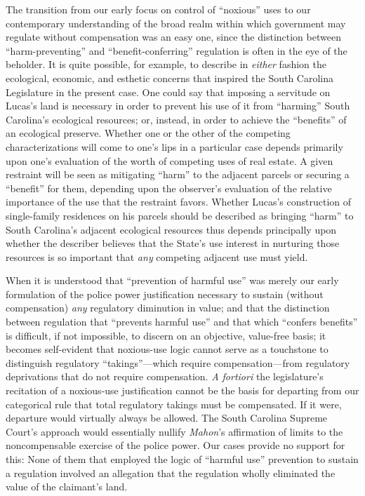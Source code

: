 The transition from our early focus on control of ``noxious'' uses to our
contemporary understanding of the broad realm within which government may
regulate without compensation was an easy one, since the distinction between
``harm-preventing'' and ``benefit-conferring'' regulation is often in the eye of
the beholder. It is quite possible, for example, to describe in \textit{either}
fashion the ecological, economic, and esthetic concerns that inspired the South
Carolina Legislature in the present case. One could say that imposing a
servitude on Lucas's land is necessary in order to prevent his use of it from
``harming'' South Carolina's ecological resources; or, instead, in order to
achieve the ``benefits'' of an ecological preserve. Whether one or the other of
the competing characterizations will come to one's lips in a particular case
depends primarily upon one's evaluation of the worth of competing uses of real
estate. A given restraint will be seen as mitigating ``harm'' to the adjacent
parcels or securing a ``benefit'' for them, depending upon the observer's
evaluation of the relative importance of the use that the restraint favors.
Whether Lucas's construction of single-family residences on his parcels should
be described as bringing ``harm'' to South Carolina's adjacent ecological
resources thus depends principally upon whether the describer believes that the
State's use interest in nurturing those resources is so important that
\textit{any} competing adjacent use must yield.

When it is understood that ``prevention of harmful use'' was merely our early
formulation of the police power justification necessary to sustain (without
compensation) \textit{any} regulatory diminution in value; and that the
distinction between regulation that ``prevents harmful use'' and that which
``confers benefits'' is difficult, if not impossible, to discern on an
objective, value-free basis; it becomes self-evident that noxious-use logic
cannot serve as a touchstone to distinguish regulatory ``takings''---which
require compensation---from regulatory deprivations that do not require
compensation. \textit{A fortiori} the legislature's recitation of a noxious-use
justification cannot be the basis for departing from our categorical rule that
total regulatory takings must be compensated. If it were, departure would
virtually always be allowed. The South Carolina Supreme Court's approach would
essentially nullify \textit{Mahon}'s affirmation of limits to the noncompensable
exercise of the police power. Our cases provide no support for this: None of
them that employed the logic of ``harmful use'' prevention to sustain a
regulation involved an allegation that the regulation wholly eliminated the
value of the claimant's land.

